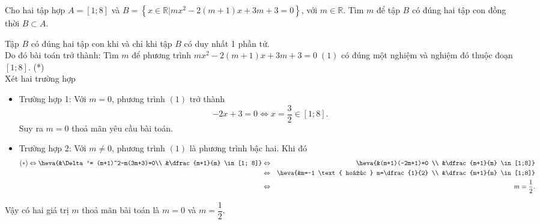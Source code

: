 \begin{bt}%
	Cho hai tập hợp $A= [1; 8]$ và $B= \left\{ x \in \mathbb{R} \big| mx^2-2(m+1)x+3m+3=0\right\}$, với $m \in \mathbb{R}$. Tìm $m$ để tập $B$ có đúng hai tập con đồng thời $B \subset A$.
	\loigiai
	{
		Tập $B$ có đúng hai tập con khi và chỉ khi tập $B$ có duy nhất 1 phần tử.\\
		Do đó bài toán trở thành: Tìm $m$ để phương trình $mx^2-2(m+1)x+3m+3=0\; (1)$ có đúng một nghiệm và nghiệm đó thuộc đoạn $[1; 8]$. \quad (*)\\
		Xét hai trường hợp
		\begin{itemize}
			\item Trường hợp 1: Với $m=0$, phương trình $(1)$ trở thành 
			\[
			-2x+3=0 \Leftrightarrow x= \dfrac{3}{2} \in [1; 8].
			\]
			Suy ra $m=0$ thoả mãn yêu cầu bài toán.
			\item Trường hợp 2: Với $m \neq 0$, phương trình $(1)$ là phương trình bậc hai. Khi đó
			\begin{eqnarray*}
				(*) \Leftrightarrow \heva{&\Delta'= (m+1)^2-m(3m+3)=0\\ &\dfrac{m+1}{m} \in [1; 8]} &\Leftrightarrow& \heva{&(m+1)(-2m+1)=0 \\ &\dfrac{m+1}{m} \in [1;8]}\\
				&\Leftrightarrow& \heva{&m=-1 \text{ hoặc } m=\dfrac{1}{2} \\ &\dfrac{m+1}{m} \in [1;8]}\\ &\Leftrightarrow& m=\dfrac{1}{2}.
			\end{eqnarray*}			
			\end{itemize}
		Vậy có hai giá trị $m$ thoả mãn bài toán là $m=0$ và $m=\dfrac{1}{2}$.
	}
\end{bt}
